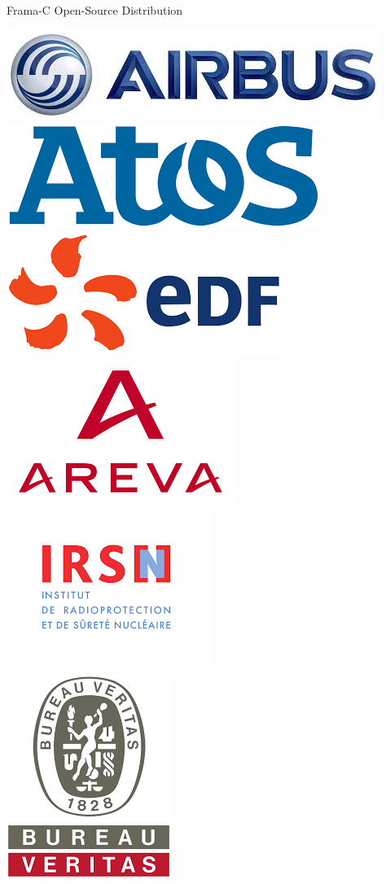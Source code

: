 \begin{frame}[fragile]{Frama-C Open-Source Distribution}
  \begin{center}
    \hfill
    \includegraphics[scale=0.12]{logos/airbus.jpg}
    \hfill
    \includegraphics[scale=0.12]{logos/atos.png}
    \hfill
    \includegraphics[scale=0.12]{logos/edf.png}
    \hfill
    \includegraphics[scale=0.12]{logos/areva.png}
    \hfill
    \includegraphics[scale=0.12]{logos/irsn.png}\\
    \hfill
    \includegraphics[scale=0.12]{logos/bv.png}

\end{center}
\end{frame}
